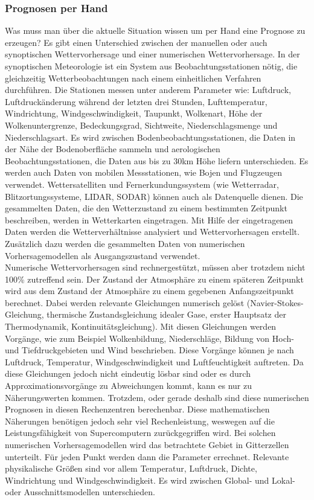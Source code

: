 \subsubsection{Prognosen per Hand} %
Was muss man über die aktuelle Situation wissen um per Hand eine Prognose zu erzeugen?
Es gibt einen Unterschied zwischen der manuellen oder auch
synoptischen Wettervorhersage und einer numerischen Wettervorhersage.
In der synoptischen Meteorologie ist ein System aus Beobachtungsstationen
nötig, die gleichzeitig Wetterbeobachtungen nach einem einheitlichen Verfahren durchführen.
Die Stationen messen unter anderem Parameter wie:
Luftdruck, Luftdruckänderung während der letzten drei Stunden,
Lufttemperatur, Windrichtung, Windgeschwindigkeit, Taupunkt,
Wolkenart, Höhe der Wolkenuntergrenze, Bedeckungsgrad,
Sichtweite, Niederschlagsmenge und Niederschlagsart.
Es wird zwischen Bodenbeobachtungsstationen, die Daten in der Nähe
der Bodenoberfläche sammeln und aerologischen Beobachtungsstationen,
die Daten aus bis zu 30km Höhe liefern unterschieden.
Es werden auch Daten von mobilen Messstationen, wie Bojen und Flugzeugen verwendet.
Wettersatelliten und Fernerkundungssystem
(wie Wetterradar, Blitzortungssysteme, LIDAR, SODAR) können auch als Datenquelle dienen.
Die gesammelten Daten, die den Wetterzustand zu einem bestimmten
Zeitpunkt beschreiben, werden in Wetterkarten eingetragen.
Mit Hilfe der eingetragenen Daten werden die Wetterverhältnisse
analysiert und Wettervorhersagen erstellt.
Zusätzlich dazu werden die gesammelten Daten von numerischen
Vorhersagemodellen als Ausgangszustand verwendet. %
\\
Numerische Wettervorhersagen sind rechnergestützt, müssen aber trotzdem nicht 100\% zutreffend sein.
Der Zustand der Atmosphäre zu einem späteren Zeitpunkt wird aus dem Zustand
der Atmosphäre zu einem gegebenen Anfangszeitpunkt berechnet.
Dabei werden relevante Gleichungen numerisch gelöst
(Navier-Stokes-Gleichung, thermische Zustandsgleichung idealer Gase,
erster Hauptsatz der Thermodynamik, Kontinuitätsgleichung).
Mit diesen Gleichungen werden Vorgänge, wie zum Beispiel Wolkenbildung,
Niederschläge, Bildung von Hoch- und Tiefdruckgebieten und Wind beschrieben.
Diese Vorgänge können je nach Luftdruck, Temperatur, Windgeschwindigkeit
und Luftfeuchtigkeit auftreten.
Da diese Gleichungen jedoch nicht eindeutig lösbar sind oder es
durch Approximationsvorgänge zu Abweichungen kommt, kann es nur zu Näherungswerten kommen.
Trotzdem, oder gerade deshalb sind diese numerischen Prognosen in diesen Rechenzentren berechenbar.
Diese mathematischen Näherungen benötigen jedoch sehr viel Rechenleistung,
weswegen auf die Leistungsfähigkeit von Supercomputern zurückgegriffen wird.
Bei solchen numerischen Vorhersagemodellen wird das betrachtete Gebiet in Gitterzellen unterteilt.
Für jeden Punkt werden dann die Parameter errechnet.
Relevante physikalische Größen sind vor allem Temperatur,
Luftdruck, Dichte, Windrichtung und Windgeschwindigkeit.
Es wird zwischen Global- und Lokal- oder Ausschnittsmodellen unterschieden.

